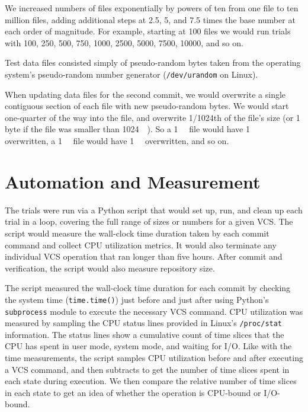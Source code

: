 We increased numbers of files exponentially by powers of ten from one file to
ten million files, adding additional steps at \num{2.5}, \num{5}, and \num{7.5}
times the base number at each order of magnitude. For example, starting at
\num{100} files we would run trials with \num{100}, \num{250}, \num{500},
\num{750}, \num{1000}, \num{2500}, \num{5000}, \num{7500}, \num{10000}, and so
on.

Test data files consisted simply of pseudo-random bytes taken from the operating
system's pseudo-random number generator (\lstinline{/dev/urandom} on Linux).

When updating data files for the second \gls{commit}, we would overwrite a
single contiguous section of each file with new pseudo-random bytes. We would
start one-quarter of the way into the file, and overwrite \num{1/1024}th of the
file's size (or 1 byte if the file was smaller than \SI{1024}{\kibi\byte}). So a
\SI{1}{\mebi\byte} file would have \SI{1}{\kibi\byte} overwritten, a
\SI{1}{\gibi\byte} file would have \SI{1}{\mebi\byte} overwritten, and so on.


\section{Automation and Measurement}

The trials were run via a Python script that would set up, run, and clean up
each trial in a loop, covering the full range of sizes or numbers for a given
\gls{VCS}. The script would measure the wall-clock time duration taken by each
\gls{commit} command and collect CPU utilization metrics. It would also
terminate any individual \gls{VCS} operation that ran longer than five hours.
After \gls{commit} and verification, the script would also measure repository
size.

The script measured the wall-clock time duration for each \gls{commit} by
checking the system time (\lstinline{time.time()}) just before and just after
using Python's \lstinline{subprocess} module to execute the necessary \gls{VCS}
command. CPU utilization was measured by sampling the CPU status lines provided
in Linux's \lstinline{/proc/stat} information. The status lines show a
cumulative count of time slices that the CPU has spent in user mode, system
mode, and waiting for I/O. Like with the time measurements, the script samples
CPU utilization before and after executing a \gls{VCS} command, and then
subtracts to get the number of time slices spent in each state during execution.
We then compare the relative number of time slices in each state to get an idea
of whether the operation is CPU-bound or I/O-bound.

